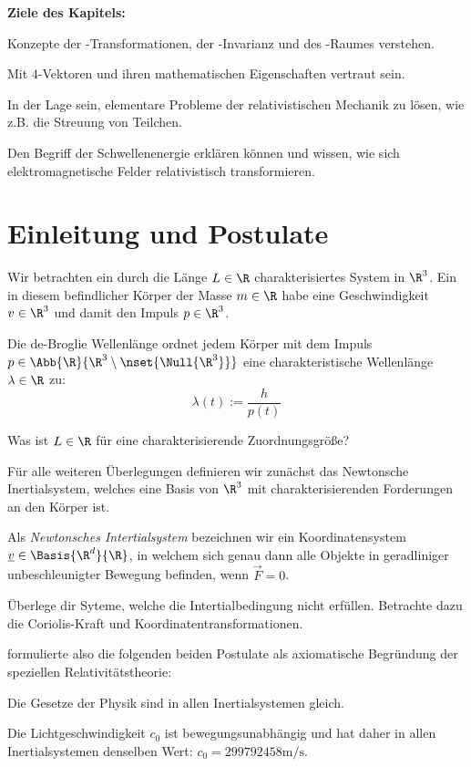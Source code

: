 \documentclass[../WiSe22ANA3.tex]{subfiles}
\begin{document}
		\textbf{Ziele des Kapitels:}
		\begin{clist}
			\item Konzepte der \Lorentz-Transformationen, der \Lorentz-Invarianz und des \Minkowski-Raumes verstehen.
			\item Mit $4$-Vektoren und ihren mathematischen Eigenschaften vertraut sein.
			\item In der Lage sein, elementare Probleme der relativistischen Mechanik zu lösen, wie z.B. die Streuung von Teilchen.
			\item Den Begriff der Schwellenenergie erklären können und wissen, wie sich elektromagnetische Felder relativistisch transformieren. 
		\end{clist}
		
		\section{Einleitung und Postulate}
			Wir betrachten ein durch die Länge $L\in\R$ charakterisiertes System in $\R^3$. Ein in diesem befindlicher Körper der Masse $m\in\R$ habe eine Geschwindigkeit $v\in\R^3$ und damit den Impuls $p\in\R^3$. 
			\begin{info}
				Die de-Broglie Wellenlänge ordnet jedem Körper mit dem Impuls $p\in\Abb{\R}{\R^3\setminus\nset{\Null{\R^3}}}$ eine charakteristische Wellenlänge $\lambda\in\R$ zu:
				$$\lambda(t):=\frac{h}{p(t)}$$
			\end{info}
			\begin{Aufgabe}
				\nr Was ist $L\in\R$ für eine charakterisierende Zuordnungsgröße?
			\end{Aufgabe}
			Für alle weiteren Überlegungen definieren wir zunächst das Newtonsche Inertialsystem, welches eine Basis von $\R^3$ mit charakterisierenden Forderungen an den Körper ist. 
			\begin{info}
				Als \emph{Newtonsches Intertialsystem} bezeichnen wir ein Koordinatensystem $\underline v\in\Basis{\R^d}{\R}$, in welchem sich genau dann alle Objekte in geradliniger unbeschleunigter Bewegung befinden, wenn $\vec F=0$. 
			\end{info}
			\begin{Aufgabe}
				\nr Überlege dir Syteme, welche die Intertialbedingung nicht erfüllen. Betrachte dazu die Coriolis-Kraft und Koordinatentransformationen. 
			\end{Aufgabe}
			\Einstein formulierte also die folgenden beiden Postulate als axiomatische Begründung der speziellen Relativitätstheorie:
			\begin{clist}
				\item Die Gesetze der Physik sind in allen Inertialsystemen gleich. 
				\item Die Lichtgeschwindigkeit $c_0$ ist bewegungsunabhängig und hat daher in allen Inertialsystemen denselben Wert: $c_0=299792458\si{\metre\per\second}$. 
			\end{clist}
		
\end{document}

